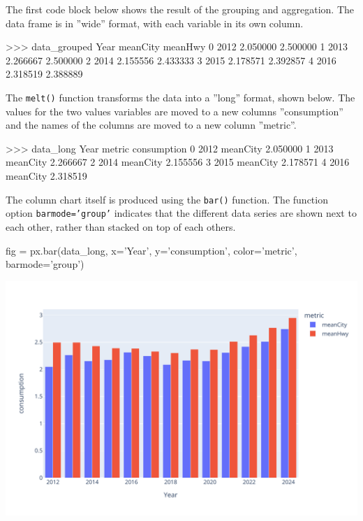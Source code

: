 The first code block below shows the result of the grouping and aggregation. The data frame is in ''wide'' format, with each variable in its own column.

\begin{samepage}
\begin{textcode}
>>> data_grouped
    Year  meanCity   meanHwy
0   2012  2.050000  2.500000
1   2013  2.266667  2.500000
2   2014  2.155556  2.433333
3   2015  2.178571  2.392857
4   2016  2.318519  2.388889
\end{textcode}
\end{samepage}

The \texttt{melt()} function transforms the data into a ''long'' format, shown below. The values for the two values variables are moved to a new columns ''consumption'' and the names of the columns are moved to a new column ''metric''. 

\begin{samepage}
\begin{textcode}
>>> data_long
    Year    metric  consumption
0   2012  meanCity     2.050000
1   2013  meanCity     2.266667
2   2014  meanCity     2.155556
3   2015  meanCity     2.178571
4   2016  meanCity     2.318519
\end{textcode}
\end{samepage}

The column chart itself is produced using the \texttt{bar()} function. The function option \texttt{barmode='group'} indicates that the different data series are shown next to each other, rather than stacked on top of each others.

\begin{samepage}
\begin{pythoncode}
fig = px.bar(data_long, 
   x='Year', y='consumption', color='metric', 
   barmode='group')
\end{pythoncode}
\end{samepage}

\begin{center}
  \includegraphics[width=.8\textwidth]{px.fuel.columns.pdf}
\end{center}

